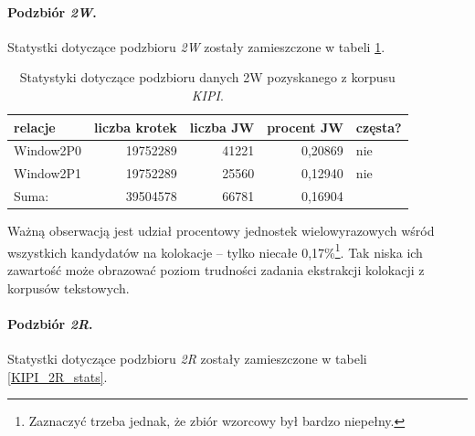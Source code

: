 \documentclass[11pt,a4paper]{llncs}
\begin{document}
\paragraph{Podzbiór \protect\textit{2W}.}
Statystki dotyczące podzbioru \emph{2W} zostały zamieszczone w tabeli \ref{KIPI_2W_stats}.

\begin{table}[h!]
\centering
\begin{tabular}{ l | r | r | r | l }
	\toprule
	\textbf{relacje} 	& \textbf{liczba krotek} & \textbf{liczba JW} & \textbf{procent JW} & \textbf{częsta?} 	\\
	\midrule
	Window2P0	&	19752289	&	41221	&	0,20869	&	nie	\\
	Window2P1	&	19752289	&	25560	&	0,12940	&	nie	\\
	\midrule									
	Suma:	&	39504578	&	66781	&	0,16904	&		\\
	\bottomrule
\end{tabular}
\caption[Statystyki podzbioru danych \emph{KIPI} 2W]{Statystyki dotyczące podzbioru danych 2W pozyskanego z korpusu \emph{KIPI}.}
\label{KIPI_2W_stats}
\end{table}

Ważną obserwacją jest udział procentowy jednostek wielowyrazowych wśród wszystkich kandydatów na kolokacje -- tylko niecałe 0,17\%\footnote{Zaznaczyć trzeba jednak, że zbiór wzorcowy był bardzo niepełny.}.
Tak niska ich zawartość może obrazować poziom trudności zadania ekstrakcji kolokacji z korpusów tekstowych.


\paragraph{Podzbiór \protect\textit{2R}.}
Statystki dotyczące podzbioru \emph{2R} zostały zamieszczone w tabeli \ref{KIPI_2R_stats}.
\end{document}
